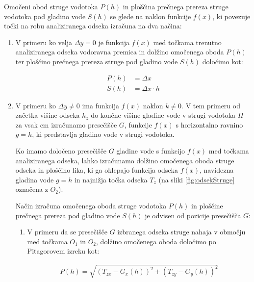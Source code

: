 Omočeni obod struge vodotoka $P(h)$ in ploščina prečnega prereza struge vodotoka pod gladino vode $S(h)$ se glede na naklon funkcije $f(x)$, ki povezuje točki na robu analiziranega odseka izračuna na dva načina:

\begin{enumerate}

\item V primeru ko velja $\Delta y = 0$ je funkcija $f(x)$ med točkama trenutno analiziranega odseka vodoravna premica in dolžino omočenega oboda $P(h)$ ter ploščino prečnega prereza struge pod gladino vode $S(h)$ določimo kot:

\begin{ceqn}
\begin{align}
P(h)&= \Delta x\\
S(h)&= \Delta x \cdot h
\end{align}
\end{ceqn}


\item V primeru ko $\Delta y \neq 0$ ima funkcija $f(x)$ naklon $k \neq 0$. V tem primeru od začetka višine odseka $h_z$ do končne višine gladine vode v strugi vodotoka $H$ za vsak cm izračunamo presečišče $G$, funkcije $f(x)$ s horizontalno ravnino $g = h$, ki predstavlja gladino vode v strugi vodotoka. 


Ko imamo določeno presečišče $G$ gladine vode s funkcijo $f(x)$ med točkama analiziranega odseka, lahko izračunamo dolžino omočenega oboda struge odseka in ploščino lika, ki ga oklepajo funkcija odseka $f(x)$, navidezna gladina vode $g = h$ in najnižja točka odseka $T_z$ (na sliki \ref{fig:odsekStruge} označena z $O_2$). 



Način izračuna omočenega oboda struge vodotoka $P(h)$ in ploščine prečnega prereza pod gladino vode $S(h)$ je odvisen od pozicije presečišča $G$:


\begin{enumerate}
	\item V primeru da se presečišče $G$ izbranega odseka struge nahaja v območju med točkama $O_1$ in $O_2$, dolžino omočenega oboda določimo po Pitagorovem izreku kot:
	
	\begin{ceqn}
		\begin{align}
		P(h) = \sqrt{(T_{zx} - G_x(h))^{2} + (T_{zy} - G_y(h))^{2}}
		\end{align}
	\end{ceqn}
	

\end{enumerate}
\end{enumerate}
